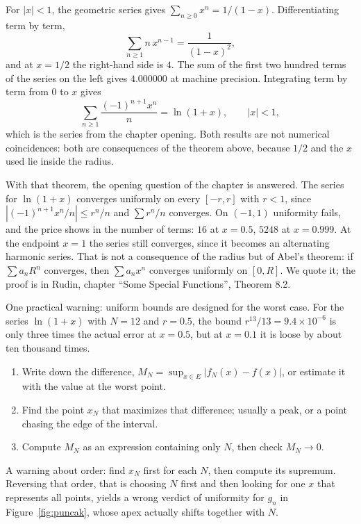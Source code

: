 \begin{contoh}
For $|x|<1$, the geometric series gives $\sum_{n\ge0}x^n=1/(1-x)$. Differentiating
term by term,
\[
  \sum_{n\ge1}n\,x^{n-1}=\frac{1}{(1-x)^2},
\]
and at $x=1/2$ the right-hand side is $4$. The sum of the first two hundred terms of the series on the
left gives $4.000000$ at machine precision. Integrating term by term from
$0$ to $x$ gives
\[
  \sum_{n\ge1}\frac{(-1)^{n+1}x^n}{n}=\ln(1+x),\qquad |x|<1,
\]
which is the series from the chapter opening. Both results are not numerical coincidences: both are
consequences of the theorem above, because $1/2$ and the $x$ used lie inside
the radius.
\end{contoh}

With that theorem, the opening question of the chapter is answered. The series for $\ln(1+x)$ converges
uniformly on every $[-r,r]$ with $r<1$, since $|(-1)^{n+1}x^n/n|\le r^n/n$
and $\sum r^n/n$ converges. On $(-1,1)$ uniformity fails, and the price shows
in the number of terms: $16$ at $x=0.5$, $5248$ at $x=0.999$. At the endpoint
$x=1$ the series still converges, since it becomes an alternating harmonic series. That is
not a consequence of the radius but of Abel's theorem: if $\sum a_nR^n$ converges,
then $\sum a_nx^n$ converges uniformly on $[0,R]$. We quote it; the proof is in
Rudin, chapter ``Some Special Functions'', Theorem 8.2.

One practical warning: uniform bounds are designed for the worst case. For the
series $\ln(1+x)$ with $N=12$ and $r=0.5$, the bound $r^{13}/13=9.4\times10^{-6}$
is only three times the actual error at $x=0.5$, but at $x=0.1$ it is loose by about
ten thousand times.

\begin{resep}
\begin{enumerate}
\item Write down the difference, $M_N=\sup_{x\in E}|f_N(x)-f(x)|$, or estimate it with
      the value at the worst point.
\item Find the point $x_N$ that maximizes that difference; usually a peak, or
      a point chasing the edge of the interval.
\item Compute $M_N$ as an expression containing only $N$, then check
      $M_N\to0$.
\end{enumerate}
A warning about order: find $x_N$ first for each $N$, then compute its
supremum. Reversing that order, that is choosing $N$ first and then looking for one $x$ that
represents all points, yields a wrong verdict of uniformity for $g_n$ in
Figure~\ref{fig:puncak}, whose apex actually shifts together with $N$.
\end{resep}

